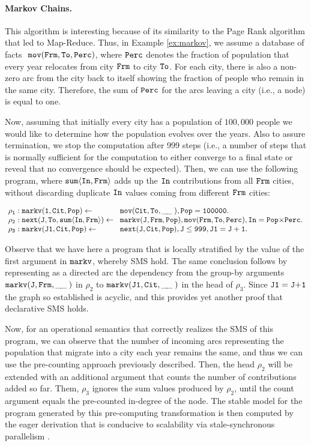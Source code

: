 \documentclass[11pt]{article}
\def\mt{\tt}
\newcommand{\cldl}{\[\begin{array}{ll}}
\newcommand{\eldl}{\end{array}\]\rm}
\newcommand{\prule}[2]{ \mt #1 \leftarrow & \mt #2 \\}
\def\inv{\vspace{-0.2cm}}
\def\inv{\vspace{-0.2cm}}
\def\f--{\tt{ \_\!\_\;}}
\begin{document}
\inv\paragraph{\bf Markov Chains.} This algorithm is interesting because of its
similarity to the Page Rank algorithm that led to Map-Reduce.
 Thus,  in Example \ref{ex:markov}, we assume a database of facts
 $~\tt mov(Frm, To,  Perc)$,  where $\tt Perc$ denotes
 the  fraction of population that every year relocates from city $\tt Frm$  to city $\tt  To$.  
For each city, there is also a non-zero arc from the city back to itself showing the fraction of people who remain in the same city.
Therefore, the sum of $\tt Perc$  for the  arcs leaving a city (i.e., a node) is equal to one. 
 
Now, assuming that initially every city has a population of $100,\!000$ people we would like to
 determine  how the  population evolves over the years.    Also  to assure termination, we stop the computation after
 999 steps (i.e., a number of steps that is normally sufficient  for the computation to either
 converge to a final state or reveal that no convergence should be expected).
 Then, we can use the following program, where  $\tt  sum\langle  In, Frm \rangle$
  adds up the
 $\tt In$  contributions from all $\tt Frm$ cities,  without discarding  duplicate  $\tt In$ values  coming from different $\tt Frm$ cities:\\[-0.1cm]

 \begin{example}
\label{ex:markov}
\inv\inv \cldl
\prule{\! \rho_1:markv(1, Cit, Pop)} {\!mov(Cit,  To, \f-- ), Pop= 100000.}
\prule{\!\rho_2: next(J, To, sum\langle  In, Frm\rangle)}{\!markv(J, Frm, Pop),  mov(Frm, To, Perc),In = Pop {\times} Perc .}
\prule{\! \rho_3: markv(J1,  Cit, Pop)}{\!next(J, Cit, Pop),  J\leq 999, J1=J+1.}
\eldl
\end{example}
Observe that we have here a program that is locally stratified by the 
value of the first argument in $\tt markv$, whereby SMS hold. The same conclusion
follows by representing as a directed arc the dependency from 
 the group-by arguments $\tt markv(J, Frm, \f--)$ in  $\rho_2$ to 
$\tt markv(J1,  Cit, \f--)$ in the head of $\rho_3$. Since $\tt J1=J{+}1$ the
graph so established is acyclic, and this provides yet another 
proof that  declarative SMS holds.

Now, for an operational semantics that correctly realizes the SMS of this program, we can observe that 
the number of incoming arcs representing the population that
migrate into a city each year remains the same, and thus we can use
the pre-counting approach  previously described. Then, the  head
$ \rho_2$ will be extended with an additional argument that counts the number of  contributions added so far.   
Them,  $ \rho_3$  ignores the sum values  produced by $ \rho_2$, until the count argument 
equals the pre-counted in-degree of the node. 
The stable model for the program generated by this pre-computing transformation is  then computed by 
the eager derivation  that is conducive to scalability via stale-synchronous parallelism \cite{ssp-iclp19,submitted}.
\end{document}
